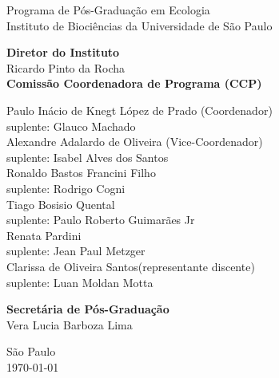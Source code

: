 {\LARGE Programa de Pós-Graduação em Ecologia \\[1ex]
  Instituto de Biociências da Universidade de São Paulo\\[1ex]
  }
\par
\vspace{0.01\paperheight}

{\Large 
  \textbf{Diretor do Instituto} \\[0.5em]
  Ricardo Pinto da Rocha\\
  \vspace{2em}
  \textbf{Comissão Coordenadora de Programa (CCP)} \\[0.5em]
  \begin{spacing}{1.2}
    Paulo Inácio de Knegt López de Prado (Coordenador)\\
    suplente: Glauco Machado \\ [0.75 em]
    Alexandre Adalardo de Oliveira (Vice-Coordenador)\\
    suplente: Isabel Alves dos Santos \\ [0.75 em]
    Ronaldo Bastos Francini Filho\\
    suplente: Rodrigo Cogni \\ [0.75 em]
    Tiago Bosisio Quental\\
    suplente: Paulo Roberto Guimarães Jr\\ [0.75 em]
    Renata Pardini\\
    suplente:  Jean Paul Metzger  \\ [0.75 em]
    Clarissa de Oliveira Santos(representante discente)\\ [0.75 em]
    suplente: Luan Moldan Motta 
  \end{spacing}
  \vspace{1.25em}
  \textbf{Secretária de Pós-Graduação}\\[0.5em]
  Vera Lucia Barboza Lima\\
}

\vfill

{\Large São Paulo\\
\today}

